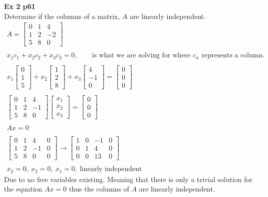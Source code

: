 \documentclass{article}
\begin{document}
  \textbf{Ex 2 p61}\\
  Determine if the columns of a matrix, $ A $ are linearly independent.
  \[
    \begin{gathered}
    A=\begin{bmatrix}
      0 &1 &4\\
      1 &2 &-2\\
      5 &8 &0
    \end{bmatrix}\\
    ~\\
    x_{1}c_{1}+x_{2}c_{2}+x_{3}c_{3}=0, \qquad \text{is what we are solving for where } c_{n} \text{ represents a column.}\\
    ~\\
    x_{1}\begin{bmatrix}
      0\\
      1\\
      5
    \end{bmatrix} +
    x_{2}\begin{bmatrix}
      1 \\
      2\\
      8
    \end{bmatrix} +x_{3} \begin{bmatrix}
      4\\
      -1\\
      0
    \end{bmatrix}  = \begin{bmatrix}
      0\\
      0\\
      0
    \end{bmatrix}\\
    ~\\
    \begin{bmatrix}
      0 &1 &4\\
      1 &2 &-1\\
      5 &8 &0
    \end{bmatrix}
    \begin{bmatrix}
      x_{1}\\
      x_{2}\\
      x_{3}  
    \end{bmatrix} =
    \begin{bmatrix}
      0\\
      0\\
      0
    \end{bmatrix}\\
    ~\\
    Ax=0 \\
    ~\\
    \begin{bmatrix}
      0 &1 &4 &0\\
      1 &2 &-1 &0\\
      5 &8 &0 &0
    \end{bmatrix}\to
    \begin{bmatrix}
      1 &0 &-1 &0\\
      0 &1 &4 &0\\
      0 &0 &13 &0
    \end{bmatrix}\\
    ~\\
  x_{3}=0,~x_{2}=0,~x_{1}=0,~\text{linearly independent} 
    \end{gathered}
  \]
  Due to no free variables existing. Meaning that there is only a trivial solution for the equation $Ax=0$ thus the columns of $A$ are linearly independent.
\end{document}
